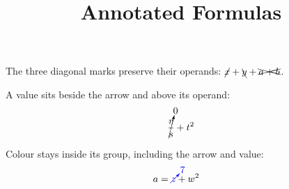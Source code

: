 \documentclass{article}
\title{Annotated Formulas}
\begin{document}
\maketitle

The three diagonal marks preserve their operands:
$\cancel{x} + \bcancel{y} + \xcancel{a+b}$.

A value sits beside the arrow and above its operand:
\[
  \cancelto{0}{\frac{r}{s}} + t^2
\]

Colour stays inside its group, including the arrow and value:
\begin{align*}
  a &= {\color{red}\textcolor{blue}{\cancelto{7}{z}}} + w^2
\end{align*}
\end{document}
